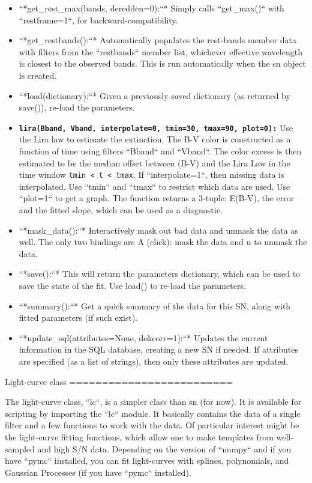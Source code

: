 \begin{itemize}
\item ``*get_rest_max(bands, deredden=0):``* Simply calls
``get_max()`` with ``restframe=1``, for backward-compatibility.
\item ``*get_restbands():``* Automatically populates the rest-bands
member data with filters from the ``restbands`` member list,
whichever effective wavelength is closest to the observed bands. This
is run automatically when the sn object is created. 
\item ``*load(dictionary):``* Given a previously saved dictionary
(as returned by save()), re-load the parameters.
\item \texttt{\textbf{lira(Bband, Vband, interpolate=0, tmin=30, tmax=90,
plot=0):}} Use the Lira law to estimate the extinction. The B-V color
is constructed as a function of time using filters ``Bband``
and ``Vband``. The color excess is then estimated to be the median
offset between (B-V) and the Lira Law in the time window \texttt{tmin
< t < tmax}. If ``interpolate=1``, then missing data is interpolated.
Use ``tmin`` and ``tmax`` to restrict which data are used.
Use ``plot=1`` to get a graph. The function returns a 3-tuple:
E(B-V), the error and the fitted slope, which can be used as a diagnostic.
\item ``*mask_data():``* Interactively mask out bad data and
unmask the data as well. The only two bindings are \textquotedbl{}A\textquotedbl{}
(click): mask the data and \textquotedbl{}u\textquotedbl{} to unmask
the data. 
\item ``*save():``* This will return the parameters dictionary,
which can be used to save the state of the fit. Use load() to re-load
the parameters. 
\item ``*summary():``* Get a quick summary of the data for this
SN, along with fitted parameters (if such exist). 
\item ``*update_sql(attributes=None, dokcorr=1):``* Updates
the current information in the SQL database, creating a new SN if
needed. If attributes are specified (as a list of strings), then only
these attributes are updated. 
\end{itemize}

Light-curve class\label{sec:Lightcurve-class}
=========================

The light-curve class, ``lc``, is a simpler class than sn (for
now). It is available for scripting by importing the ``lc`` module.
It basically contains the data of a single filter and a few functions
to work with the data. Of particular interest might be the light-curve
fitting functions, which allow one to make templates from well-sampled
and high S/N data. Depending on the version of ``numpy`` and
if you have ``pymc`` installed, you can fit light-curves with
splines, polynomials, and Gaussian Processes (if you have ``pymc``
installed).


